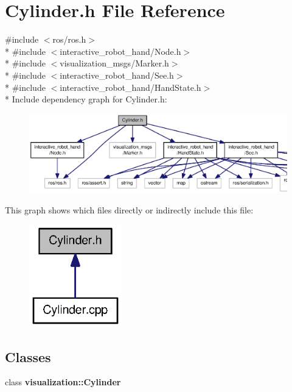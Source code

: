 \section{Cylinder.\-h File Reference}
\label{Cylinder_8h}
{\ttfamily \#include $<$ros/ros.\-h$>$}\\*
{\ttfamily \#include $<$interactive\-\_\-robot\-\_\-hand/\-Node.\-h$>$}\\*
{\ttfamily \#include $<$visualization\-\_\-msgs/\-Marker.\-h$>$}\\*
{\ttfamily \#include $<$interactive\-\_\-robot\-\_\-hand/\-See.\-h$>$}\\*
{\ttfamily \#include $<$interactive\-\_\-robot\-\_\-hand/\-Hand\-State.\-h$>$}\\*
Include dependency graph for Cylinder.\-h\-:\nopagebreak
\begin{figure}[H]
\begin{center}
\leavevmode
\includegraphics[width=350pt]{Cylinder_8h__incl}
\end{center}
\end{figure}
This graph shows which files directly or indirectly include this file\-:\nopagebreak
\begin{figure}[H]
\begin{center}
\leavevmode
\includegraphics[width=114pt]{Cylinder_8h__dep__incl}
\end{center}
\end{figure}
\subsection*{Classes}
\begin{DoxyCompactItemize}
\item 
class {\bf visualization\-::\-Cylinder}
\end{DoxyCompactItemize}
